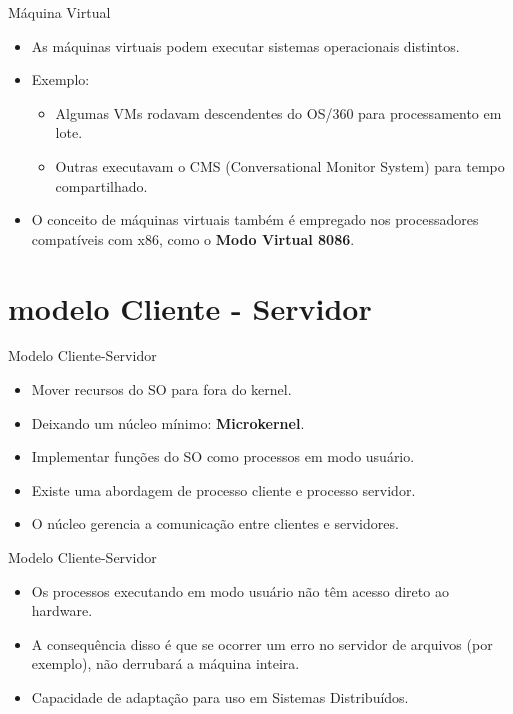 \documentclass{beamer}
\begin{document}
\begin{frame}{Máquina Virtual}
    \begin{itemize}
        \item As máquinas virtuais podem executar sistemas operacionais distintos.
        \item Exemplo:
        \begin{itemize}
            \item Algumas VMs rodavam descendentes do OS/360 para processamento em lote.
            \item Outras executavam o CMS (Conversational Monitor System) para tempo compartilhado.
        \end{itemize}
        \item O conceito de máquinas virtuais também é empregado nos processadores compatíveis com x86, como o \textbf{Modo Virtual 8086}.
    \end{itemize}
\end{frame}


\section{modelo Cliente - Servidor}
\begin{frame}{Modelo Cliente-Servidor}
    \begin{itemize}
        \item Mover recursos do SO para fora do kernel.
        \item Deixando um núcleo mínimo: \textbf{Microkernel}.
        \item Implementar funções do SO como processos em modo usuário.
        \item Existe uma abordagem de processo cliente e processo servidor.
        \item O núcleo gerencia a comunicação entre clientes e servidores.
    \end{itemize}
\end{frame}
\begin{frame}{Modelo Cliente-Servidor}
    \begin{itemize}
        \item Os processos executando em modo usuário não têm acesso direto ao hardware.
        \item A consequência disso é que se ocorrer um erro no servidor de arquivos (por exemplo), não derrubará a máquina inteira.
        \item Capacidade de adaptação para uso em Sistemas Distribuídos.
    \end{itemize}
\end{frame}
\end{document}
